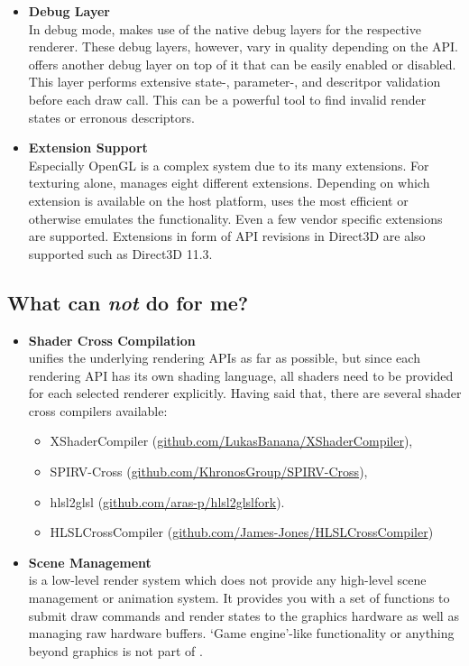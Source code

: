 \documentclass{article}
\begin{document}
\begin{itemize}
	\item \textbf{Debug Layer} \\
	In debug mode, \LLGL makes use of the native debug layers for the respective renderer.
	These debug layers, however, vary in quality depending on the API.
	\LLGL offers another debug layer on top of it that can be easily enabled or disabled.
	This layer performs extensive state-, parameter-, and descritpor validation before each draw call.
	This can be a powerful tool to find invalid render states or erronous descriptors.
	
	\item \textbf{Extension Support} \\
	Especially OpenGL is a complex system due to its many extensions.
	For texturing alone, \LLGL manages eight different extensions.
	Depending on which extension is available on the host platform, \LLGL uses the most efficient or otherwise emulates the functionality.
	Even a few vendor specific extensions are supported. Extensions in form of API revisions in Direct3D are also supported such as Direct3D 11.3.
\end{itemize}


\subsection{What can \LLGL \emph{not} do for me?}

\begin{itemize}
	\item \textbf{Shader Cross Compilation} \\
	\LLGL unifies the underlying rendering APIs as far as possible, but since each rendering API has its own shading language,
	all shaders need to be provided for each selected renderer explicitly.
	Having said that, there are several shader cross compilers available:
	\begin{itemize}
	\item XShaderCompiler (\href{https://github.com/LukasBanana/XShaderCompiler}{github.com/LukasBanana/XShaderCompiler}),
	\item SPIRV-Cross (\href{https://github.com/KhronosGroup/SPIRV-Cross}{github.com/KhronosGroup/SPIRV-Cross}),
	\item hlsl2glsl (\href{https://github.com/aras-p/hlsl2glslfork}{github.com/aras-p/hlsl2glslfork}).
	\item HLSLCrossCompiler (\href{https://github.com/James-Jones/HLSLCrossCompiler}{github.com/James-Jones/HLSLCrossCompiler})
	\end{itemize}
	
	\item \textbf{Scene Management} \\
	\LLGL is a low-level render system which does not provide any high-level scene management or animation system.
	It provides you with a set of functions to submit draw commands and render states to the graphics hardware as well as managing raw hardware buffers.
	`Game engine'-like functionality or anything beyond graphics is not part of \LLGL.
\end{itemize}
\end{document}
